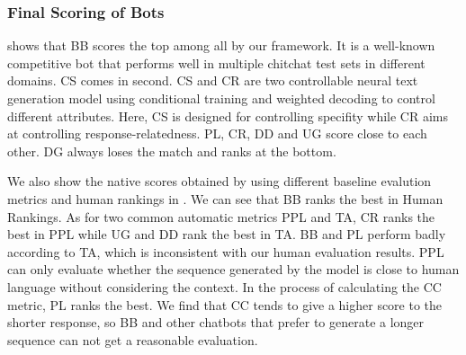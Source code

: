 \subsubsection*{Final Scoring of Bots}

shows that BB scores the top among all by our framework. 
It is a well-known competitive bot that performs well in multiple 
chitchat test sets in different domains. 
CS comes in second. 
CS and CR are two controllable neural text generation model 
using conditional training and weighted decoding to control
different attributes.
Here, CS is designed for controlling specifity while CR aims at controlling response-relatedness.
PL, CR, DD and UG score close to each other. 
DG always loses the match and ranks at the bottom.
  
We also show the native scores obtained by using different baseline evalution metrics and human rankings in . 
We can see that BB ranks the best in Human Rankings. As for two common automatic metrics PPL and TA, CR ranks the best in PPL while UG and DD rank the best in TA. 
BB and PL perform badly according to TA, which is inconsistent with our human evaluation results. PPL can only evaluate whether the sequence generated by the model is close to human language without considering the context. 
In the process of calculating the CC metric, PL ranks the best. 
We find that CC tends to give a higher score to the shorter response, 
so BB and other chatbots that prefer to generate a longer sequence can not get a reasonable evaluation.

